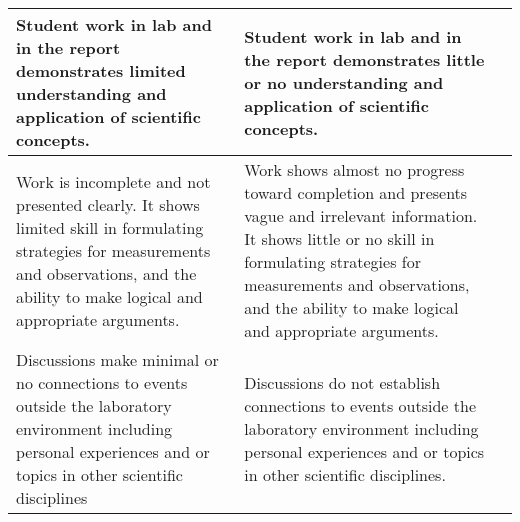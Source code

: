 \begin{table*}
\begin{tabular}{p{2in}p{2in}p{2in}}
Student work in lab and in the report demonstrates limited understanding and application of scientific concepts.
	&Student work in lab and in the report demonstrates little or no understanding and application of scientific concepts.\\
	\midrule
Work is incomplete and not presented clearly. It shows limited skill in formulating strategies for measurements and observations, and the ability to make logical and appropriate arguments.
	&Work shows almost no progress toward completion and presents vague and irrelevant information. It shows little or no skill in formulating strategies for measurements and observations, and the ability to make logical and appropriate arguments.\\
	\midrule
Discussions make minimal or no connections to events outside the laboratory environment including personal experiences and or topics in other scientific disciplines
	&Discussions do not establish connections to events outside the laboratory environment including personal experiences and or topics in other scientific disciplines.\\
	\bottomrule
\end{tabular}
\end{table*}


